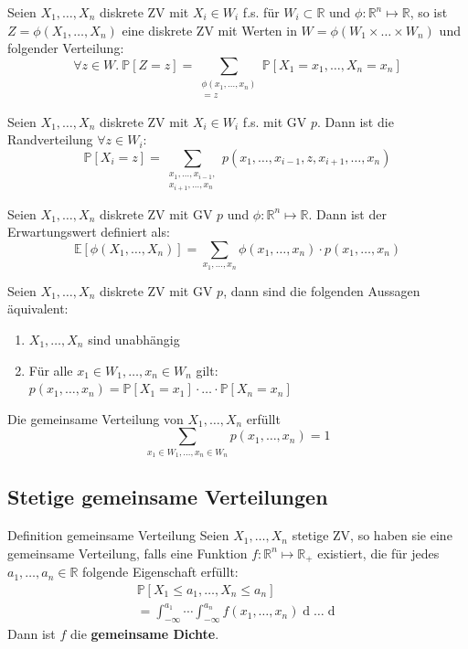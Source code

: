 \documentclass[a4paper,10pt]{article}
\def\R{\mathbb{R}}
\def\P{\mathbb{P}}
\def\E{\mathbb{E}}
\begin{document}
Seien \(X_1,\ldots,X_n\) diskrete ZV mit \(X_i \in W_i\) f.s. für \(W_i \subset \R\) und \(\phi: \R^n \mapsto \R\), so ist \(Z = \phi(X_1, \ldots, X_n)\) eine diskrete ZV mit Werten in \(W = \phi(W_1 \times \ldots \times W_n)\) und folgender Verteilung:
\[\forall z \in W. \ \P[Z = z] = \sum_{\substack{\phi(x_1, \ldots, x_n) \\= z}} \P[X_1 = x_1, \ldots, X_n = x_n]\]

Seien \(X_1,\ldots,X_n\) diskrete ZV mit \(X_i \in W_i\) f.s. mit GV \(p\). Dann ist die Randverteilung \(\forall z \in W_i\):
\[\P[X_i = z] = \sum_{\substack{x_1, \ldots, x_{i-1}, \\x_{i+1},\ldots,x_n}} p(x_1, \ldots, x_{i-1}, z, x_{i+1},\ldots,x_n)\]

Seien \(X_1,\ldots,X_n\) diskrete ZV mit GV \(p\) und \(\phi : \R^n \mapsto \R\). Dann ist der Erwartungswert definiert als:
\[\E[\phi(X_1, \ldots, X_n)] = \sum_{x_1,\ldots,x_n} \phi(x_1,\ldots,x_n) \cdot p(x_1,\ldots,x_n)\]

Seien \(X_1,\ldots,X_n\) diskrete ZV mit GV \(p\), dann sind die folgenden Aussagen äquivalent:
\begin{enumerate}
	\item \(X_1,\ldots,X_n\) sind unabhängig
	\item Für alle \(x_1 \in W_1, \ldots, x_n \in W_n\) gilt:
	      \(p(x_1,\ldots,x_n) = \P[X_1 = x_1] \cdot \ldots \cdot \P[X_n = x_n]\)
\end{enumerate}

Die gemeinsame Verteilung von \(X_1, \ldots, X_n\) erfüllt
\[\sum_{x_1\in W_1, \ldots, x_n \in W_n} p(x_1, \ldots, x_n) = 1\]

\subsection{Stetige gemeinsame Verteilungen}
\begin{subbox}{Definition gemeinsame Verteilung}
	Seien \(X_1, \ldots, X_n\) stetige ZV, so haben sie eine gemeinsame Verteilung, falls eine Funktion \(f: \R^n \mapsto \R_+\) existiert, die für jedes \(a_1, \ldots, a_n \in \R\) folgende Eigenschaft erfüllt:
	\begin{align*}
		\P[X_1 \le a_1, \ldots, X_n \le a_n] \\= \int_{-\infty}^{a_1} \cdots \int_{-\infty}^{a_n} f(x_1, \ldots, x_n) \mathop{dx_n} \ldots \mathop{dx_1}
	\end{align*}
	Dann ist \(f\) die \textbf{gemeinsame Dichte}.
\end{subbox}
\end{document}
